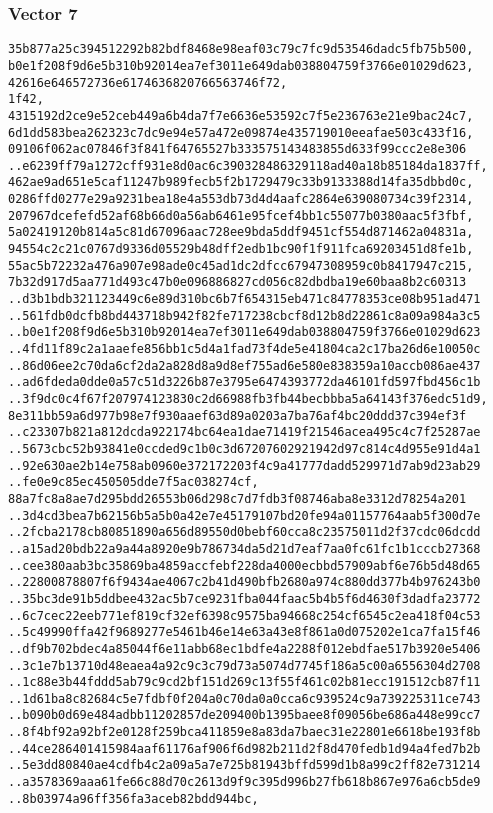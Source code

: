 \documentclass[
]{article}
\begin{document}
\hypertarget{vector-7-2}{%
\subsubsection{Vector 7}\label{vector-7-2}}

\begin{verbatim}
35b877a25c394512292b82bdf8468e98eaf03c79c7fc9d53546dadc5fb75b500,
b0e1f208f9d6e5b310b92014ea7ef3011e649dab038804759f3766e01029d623,
42616e646572736e6174636820766563746f72,
1f42,
4315192d2ce9e52ceb449a6b4da7f7e6636e53592c7f5e236763e21e9bac24c7,
6d1dd583bea262323c7dc9e94e57a472e09874e435719010eeafae503c433f16,
09106f062ac07846f3f841f64765527b333575143483855d633f99ccc2e8e306
..e6239ff79a1272cff931e8d0ac6c390328486329118ad40a18b85184da1837ff,
462ae9ad651e5caf11247b989fecb5f2b1729479c33b9133388d14fa35dbbd0c,
0286ffd0277e29a9231bea18e4a553db73d4d4aafc2864e639080734c39f2314,
207967dcefefd52af68b66d0a56ab6461e95fcef4bb1c55077b0380aac5f3fbf,
5a02419120b814a5c81d67096aac728ee9bda5ddf9451cf554d871462a04831a,
94554c2c21c0767d9336d05529b48dff2edb1bc90f1f911fca69203451d8fe1b,
55ac5b72232a476a907e98ade0c45ad1dc2dfcc67947308959c0b8417947c215,
7b32d917d5aa771d493c47b0e096886827cd056c82dbdba19e60baa8b2c60313
..d3b1bdb321123449c6e89d310bc6b7f654315eb471c84778353ce08b951ad471
..561fdb0dcfb8bd443718b942f82fe717238cbcf8d12b8d22861c8a09a984a3c5
..b0e1f208f9d6e5b310b92014ea7ef3011e649dab038804759f3766e01029d623
..4fd11f89c2a1aaefe856bb1c5d4a1fad73f4de5e41804ca2c17ba26d6e10050c
..86d06ee2c70da6cf2da2a828d8a9d8ef755ad6e580e838359a10accb086ae437
..ad6fdeda0dde0a57c51d3226b87e3795e6474393772da46101fd597fbd456c1b
..3f9dc0c4f67f207974123830c2d66988fb3fb44becbbba5a64143f376edc51d9,
8e311bb59a6d977b98e7f930aaef63d89a0203a7ba76af4bc20ddd37c394ef3f
..c23307b821a812dcda922174bc64ea1dae71419f21546acea495c4c7f25287ae
..5673cbc52b93841e0ccded9c1b0c3d67207602921942d97c814c4d955e91d4a1
..92e630ae2b14e758ab0960e372172203f4c9a41777dadd529971d7ab9d23ab29
..fe0e9c85ec450505dde7f5ac038274cf,
88a7fc8a8ae7d295bdd26553b06d298c7d7fdb3f08746aba8e3312d78254a201
..3d4cd3bea7b62156b5a5b0a42e7e45179107bd20fe94a01157764aab5f300d7e
..2fcba2178cb80851890a656d89550d0bebf60cca8c23575011d2f37cdc06dcdd
..a15ad20bdb22a9a44a8920e9b786734da5d21d7eaf7aa0fc61fc1b1cccb27368
..cee380aab3bc35869ba4859accfebf228da4000ecbbd57909abf6e76b5d48d65
..22800878807f6f9434ae4067c2b41d490bfb2680a974c880dd377b4b976243b0
..35bc3de91b5ddbee432ac5b7ce9231fba044faac5b4b5f6d4630f3dadfa23772
..6c7cec22eeb771ef819cf32ef6398c9575ba94668c254cf6545c2ea418f04c53
..5c49990ffa42f9689277e5461b46e14e63a43e8f861a0d075202e1ca7fa15f46
..df9b702bdec4a85044f6e11abb68ec1bdfe4a2288f012ebdfae517b3920e5406
..3c1e7b13710d48eaea4a92c9c3c79d73a5074d7745f186a5c00a6556304d2708
..1c88e3b44fddd5ab79c9cd2bf151d269c13f55f461c02b81ecc191512cb87f11
..1d61ba8c82684c5e7fdbf0f204a0c70da0a0cca6c939524c9a739225311ce743
..b090b0d69e484adbb11202857de209400b1395baee8f09056be686a448e99cc7
..8f4bf92a92bf2e0128f259bca411859e8a83da7baec31e22801e6618be193f8b
..44ce286401415984aaf61176af906f6d982b211d2f8d470fedb1d94a4fed7b2b
..5e3dd80840ae4cdfb4c2a09a5a7e725b81943bffd599d1b8a99c2ff82e731214
..a3578369aaa61fe66c88d70c2613d9f9c395d996b27fb618b867e976a6cb5de9
..8b03974a96ff356fa3aceb82bdd944bc,
\end{verbatim}
\end{document}
